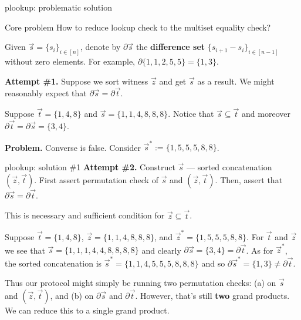 \documentclass{zkdl-presentation-template}
\begin{document}
    \begin{frame}{plookup: problematic solution}
        \begin{alertblock}{Core problem}
            How to reduce lookup check to the multiset equality check?\pause
        \end{alertblock}

        \begin{definition}
            Given $\vec{s} = \{s_i\}_{i \in [n]}$, denote by $\partial\vec{s}$
            the \textbf{difference set} $\{s_{i+1}-s_i\}_{i \in [n-1]}$ without
            zero elements. For example, $\partial\{1,1,2,5,5\} = \{1,3\}$.\pause
        \end{definition}

        \textbf{Attempt \#1.} Suppose we sort witness $\vec{z}$ and get
        $\vec{s}$ as a result. We might reasonably expect that $\partial\vec{s}
        = \partial\vec{t}$.\pause
        \begin{example}
            Suppose $\vec{t}=\{1,4,8\}$ and $\vec{s} = \{1,1,4,8,8,8\}$. Notice
            that $\vec{s} \subseteq \vec{t}$ and moreover $\partial\vec{t} =
            \partial\vec{s} = \{3,4\}$.\pause
        \end{example}

        \textcolor{oc-red-8}{\textbf{Problem.}} Converse is false. Consider $\vec{s}^*:=\{1,5,5,5,8,8\}$.
    \end{frame}

    \begin{frame}{plookup: solution \#1}
        \textbf{Attempt \#2.} Construct $\vec{s}$ --- sorted concatenation
        $(\vec{z},\vec{t})$. First assert permutation check of $\vec{s}$ and
        $(\vec{z},\vec{t})$. Then, assert that $\partial\vec{s} =
        \partial\vec{t}$.\pause
        
        \begin{proposition}
            This is necessary and sufficient condition for $\vec{z} \subseteq
            \vec{t}$.\pause
        \end{proposition}

        \begin{example}
            Suppose $\vec{t} = \{1,4,8\}$, $\vec{z} = \{1,1,4,8,8,8\}$, and
            $\vec{z}^*=\{1,5,5,5,8,8\}$. For $\vec{t}$ and $\vec{z}$ we see that
            $\vec{s} = \{1,1,1,4,4,8,8,8,8\}$ and clearly $\partial\vec{s} =
            \{3,4\} = \partial\vec{t}$. As for $\vec{z}^*$, the sorted
            concatenation is $\vec{s}^*=\{1,1,4,5,5,5,8,8,8\}$ and so
            $\partial\vec{s}^*=\{1,3\} \neq \partial\vec{t}$.\pause
        \end{example}

        Thus our protocol might simply be running two permutation checks: (a) on
        $\vec{s}$ and $(\vec{z},\vec{t})$, and (b) on $\partial\vec{s}$ and
        $\partial\vec{t}$. However, that's still \textbf{two} grand products. We
        can reduce this to a single grand product.
    \end{frame}
\end{document}
